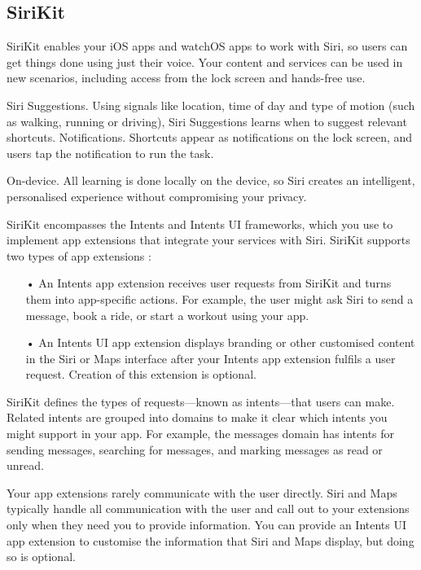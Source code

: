 \documentclass[14pt,a4paper]{article}
\begin{document}
\subsection{SiriKit}
\par SiriKit enables your iOS apps and watchOS apps to work with Siri, so users can get things done using just their voice. Your content and services can be used in new scenarios, including access from the lock screen and hands-free use.
\par Siri Suggestions. Using signals like location, time of day and type of motion (such as walking, running or driving), Siri Suggestions learns when to suggest relevant shortcuts.
Notifications. Shortcuts appear as notifications on the lock screen, and users tap the notification to run the task.
\par On-device. All learning is done locally on the device, so Siri creates an intelligent, personalised experience without compromising your privacy.
\par SiriKit encompasses the Intents and Intents UI frameworks, which you use to implement app extensions that integrate your services with Siri. SiriKit supports two types of app extensions :
\begin{enumerate}
\item[•] An Intents app extension receives user requests from SiriKit and turns them into app-specific actions. For example, the user might ask Siri to send a message, book a ride, or start a workout using your app.
\item[•] An Intents UI app extension displays branding or other customised content in the Siri or Maps interface after your Intents app extension fulfils a user request. Creation of this extension is optional.
\end{enumerate}
\par SiriKit defines the types of requests—known as intents—that users can make. Related intents are grouped into domains to make it clear which intents you might support in your app. For example, the messages domain has intents for sending messages, searching for messages, and marking messages as read or unread.
\par Your app extensions rarely communicate with the user directly. Siri and Maps typically handle all communication with the user and call out to your extensions only when they need you to provide information. You can provide an Intents UI app extension to customise the information that Siri and Maps display, but doing so is optional.
\end{document}
